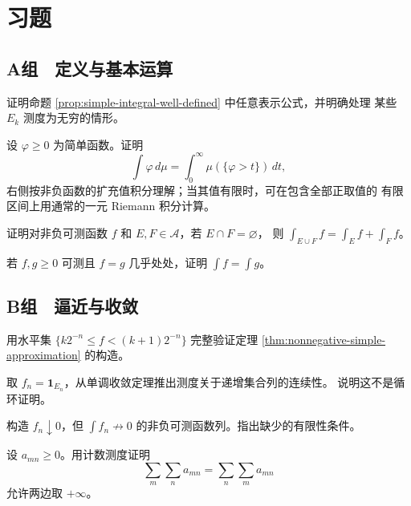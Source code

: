 \section*{习题}

\subsection*{A组　定义与基本运算}
\begin{enumerate}[label=\textbf{\thechapter.\arabic*.}]
证明命题 \ref{prop:simple-integral-well-defined} 中任意表示公式，并明确处理
某些 \(E_k\) 测度为无穷的情形。

设 \(\varphi\ge0\) 为简单函数。证明
\[
 \int\varphi\,d\mu=\int_0^\infty\mu(\{\varphi>t\})\,dt,
\]
右侧按非负函数的扩充值积分理解；当其值有限时，可在包含全部正取值的
有限区间上用通常的一元 Riemann 积分计算。

证明对非负可测函数 \(f\) 和 \(E,F\in\mathcal A\)，若 \(E\cap F=\varnothing\)，
则 \(\int_{E\cup F}f=\int_Ef+\int_Ff\)。

若 \(f,g\ge0\) 可测且 \(f=g\) 几乎处处，证明
\(\int f=\int g\)。

\end{enumerate}
\subsection*{B组　逼近与收敛}
\begin{enumerate}[label=\textbf{\thechapter.\arabic*.},resume]
用水平集 \(\{k2^{-n}\le f<(k+1)2^{-n}\}\) 完整验证定理
\ref{thm:nonnegative-simple-approximation} 的构造。

取 \(f_n=\mathbf1_{E_n}\)，从单调收敛定理推出测度关于递增集合列的连续性。
说明这不是循环证明。

构造 \(f_n\downarrow0\)，但
\(\int f_n\not\to0\) 的非负可测函数列。指出缺少的有限性条件。

设 \(a_{mn}\ge0\)。用计数测度证明
\[
 \sum_m\sum_na_{mn}=\sum_n\sum_ma_{mn}
\]
允许两边取 \(+\infty\)。

\end{enumerate}
